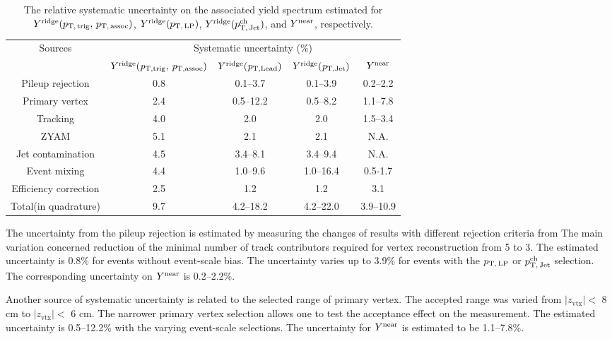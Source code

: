 \begin{table}[h!]
\caption{The relative systematic uncertainty on the associated yield spectrum estimated for $Y^{\rm{ridge}}(p_\mathrm{T,\,trig},\,p_\mathrm{T,\,assoc})$, $Y^{\rm{ridge}}(p_\mathrm{T,\,LP})$, $Y^{\rm{ridge}}(p_\mathrm{T,\,Jet}^\mathrm{ch})$, and $Y^{\rm{near}}$, respectively.}
\centering
\begin{tabular}{|c|c|c|c|c|}
\hline 
\multirow{2}{*}{Sources}  & \multicolumn{4}{c|}{Systematic uncertainty (\%)} \\\cline{2-5} 
         & $Y^{\rm{ridge}}(\it{p}_{\rm{T, trig}},\,\it{p}_{\rm{T, assoc}})$ & $Y^{\rm{ridge}}(\it{p}_{\rm{T, Lead}})$ & $Y^{\rm{ridge}}(\it{p}_{\rm{T, Jet}})$ & $Y^{\rm{near}}$ \\ \hline \hline
Pileup rejection		& 0.8	&0.1--3.7		&0.1--3.9	&0.2--2.2	\\ \hline
Primary vertex		& 2.4	&0.5--12.2	&0.5--8.2	&1.1--7.8	\\ \hline

Tracking			& 4.0 	&2.0		&2.0	&1.5--3.4	\\ \hline

ZYAM			& 5.1	&2.1		&2.1	&N.A.	\\ \hline
Jet contamination	& 4.5	&3.4--8.1		&3.4--9.4	&N.A.	\\ \hline

Event mixing			& 4.4	&1.0--9.6		&1.0--16.4	&0.5-1.7	\\ \hline

Efficiency correction	& 2.5 	&1.2		&1.2	&3.1	\\ \hline \hline
Total(in quadrature)			& 9.7	&4.2--18.2	&4.2--22.0	&3.9--10.9 \\ 
\hline 
\end{tabular}
\label{tab:syst}
\end{table}

The uncertainty from the pileup rejection is estimated by measuring the changes of results with different rejection criteria from The main variation concerned reduction of the minimal number of track contributors required for vertex reconstruction from 5 to 3. The estimated uncertainty is 0.8\% for events without event-scale bias. The uncertainty varies up to 3.9\% for events with the $p_\mathrm{T,\,LP}$ or $p_\mathrm{T,\,Jet}^\mathrm{ch}$ selection. The corresponding uncertainty on $Y^{\rm{near}}$ is 0.2--2.2\%.
 
Another source of systematic uncertainty is related to the selected range of primary vertex. The accepted range was varied from $|z_\mathrm{vtx}|<$ 8 cm to $|z_\mathrm{vtx}|<$ 6 cm. The narrower primary vertex selection allows one to test the acceptance effect on the measurement. The estimated uncertainty is 0.5--12.2\% with the varying event-scale selections. The uncertainty for $Y^{\rm{near}}$ is estimated to be 1.1--7.8\%.

